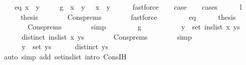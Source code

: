 \begin{isabellebody}
\ \ \ \ {\isacharparenleft}{\kern0pt}eq{\isacharparenright}{\kern0pt}\ {\isachardoublequoteopen}x\ {\isacharequal}{\kern0pt}\ y{\isachardoublequoteclose}\ {\isacharbar}{\kern0pt}\isanewline
\ \ \ \ {\isacharparenleft}{\kern0pt}g{\isacharparenright}{\kern0pt}\ {\isachardoublequoteopen}{\isasymnot}\ x\ {\isacharless}{\kern0pt}\ y\ {\isasymand}\ {\isasymnot}\ x\ {\isacharequal}{\kern0pt}\ y{\isachardoublequoteclose}\isanewline
\ \ \ \ \isamarkupfalse%
\ fastforce\isanewline
\ \ \isamarkupfalse%
\ {\isacharquery}{\kern0pt}case\isanewline
\ \ \isamarkupfalse%
\ {\isacharparenleft}{\kern0pt}cases{\isacharparenright}{\kern0pt}\isanewline
\ \ \ \ \isamarkupfalse%
\ l\isanewline
\ \ \ \ \isamarkupfalse%
\ {\isacharquery}{\kern0pt}thesis\isanewline
\ \ \ \ \ \ \isamarkupfalse%
\ Cons{\isachardot}{\kern0pt}prems\isanewline
\ \ \ \ \ \ \isamarkupfalse%
\ fastforce\isanewline
\ \ \isamarkupfalse%
\isanewline
\ \ \ \ \isamarkupfalse%
\ eq\isanewline
\ \ \ \ \isamarkupfalse%
\ {\isacharquery}{\kern0pt}thesis\isanewline
\ \ \ \ \ \ \isamarkupfalse%
\ Cons{\isachardot}{\kern0pt}prems\isanewline
\ \ \ \ \ \ \isamarkupfalse%
\ simp\isanewline
\ \ \isamarkupfalse%
\isanewline
\ \ \ \ \isamarkupfalse%
\ g\isanewline
\ \ \ \ \isamarkupfalse%
\isanewline
\ \ \ \ \ \ {\isachardoublequoteopen}y\ {\isasymnotin}\ set\ {\isacharparenleft}{\kern0pt}ins{\isacharunderscore}{\kern0pt}list\ x\ ys{\isacharparenright}{\kern0pt}{\isachardoublequoteclose}\isanewline
\ \ \ \ \ \ {\isachardoublequoteopen}distinct\ {\isacharparenleft}{\kern0pt}ins{\isacharunderscore}{\kern0pt}list\ x\ ys{\isacharparenright}{\kern0pt}{\isachardoublequoteclose}\isanewline
\ \ \ \ \ \ \isamarkupfalse%
\ Cons{\isachardot}{\kern0pt}prems\isanewline
\ \ \ \ \ \ \isamarkupfalse%
\ simp{\isacharplus}{\kern0pt}\isanewline
\ \ \ \ \isamarkupfalse%
\isanewline
\ \ \ \ \ \ {\isachardoublequoteopen}y\ {\isasymnotin}\ set\ ys{\isachardoublequoteclose}\isanewline
\ \ \ \ \ \ {\isachardoublequoteopen}distinct\ ys{\isachardoublequoteclose}\isanewline
\ \ \ \ \ \ \isamarkupfalse%
\ {\isacharparenleft}{\kern0pt}auto\ simp\ add{\isacharcolon}{\kern0pt}\ set{\isacharunderscore}{\kern0pt}ins{\isacharunderscore}{\kern0pt}list\ intro{\isacharcolon}{\kern0pt}\ Cons{\isachardot}{\kern0pt}IH{\isacharparenright}{\kern0pt}\isanewline

\end{isabellebody}
